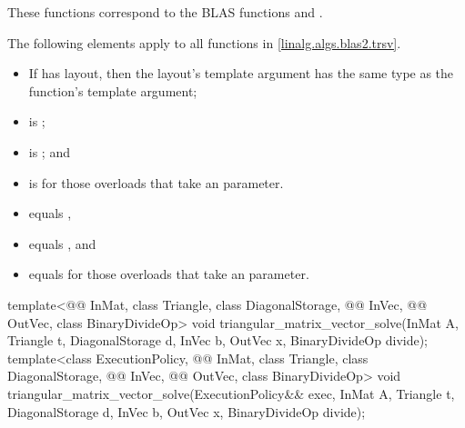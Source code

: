 \pnum
\begin{note}
These functions correspond to the BLAS functions
 and \supercite{blas2}.
\end{note}

\pnum
The following elements apply to all functions in \ref{linalg.algs.blas2.trsv}.

\pnum
\mandates
\begin{itemize}
\item
If  has  layout,
then the layout's  template argument has
the same type as the function's  template argument;
\item
{}
is ;
\item
{}
is ; and
\item
{}
is  for those overloads that take an  parameter.
\end{itemize}

\pnum
\expects
\begin{itemize}
\item
{} equals ,
\item
{} equals , and
\item
{} equals 
for those overloads that take an  parameter.
\end{itemize}

\begin{itemdecl}
  template<@@ InMat, class Triangle, class DiagonalStorage,
           @@ InVec, @@ OutVec, class BinaryDivideOp>
    void triangular_matrix_vector_solve(InMat A, Triangle t, DiagonalStorage d,
                                        InVec b, OutVec x, BinaryDivideOp divide);
  template<class ExecutionPolicy, @@ InMat, class Triangle, class DiagonalStorage,
           @@ InVec, @@ OutVec, class BinaryDivideOp>
    void triangular_matrix_vector_solve(ExecutionPolicy&& exec,
                                        InMat A, Triangle t, DiagonalStorage d,
                                        InVec b, OutVec x, BinaryDivideOp divide);
\end{itemdecl}

